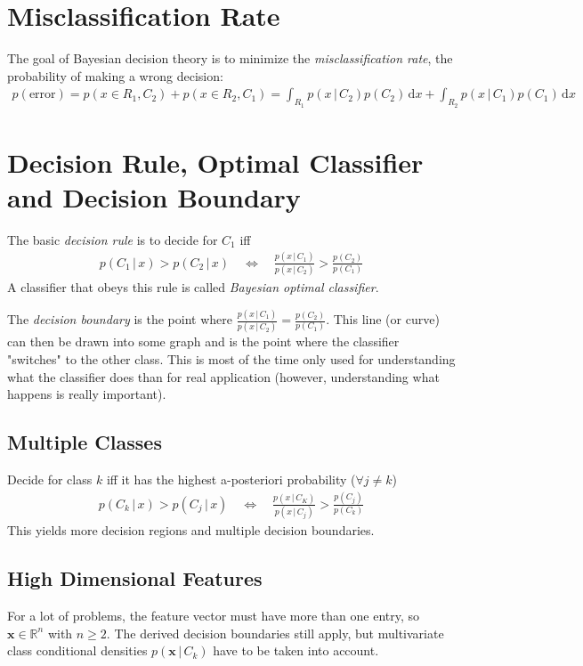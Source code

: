 \documentclass[a4paper, 11pt, accentcolor = tud3b]{tudreport}
\newcommand{\given}{\ensuremath{\,\vert\,}}
\newcommand{\R}{\ensuremath{\mathbb{R}}}
\newcommand{\dif}[1]{\ensuremath{\,\mathrm{d}#1}}
\renewcommand{\vec}[1]{\mathbf{#1}}
\begin{document}
		\section{Misclassification Rate}
			The goal of Bayesian decision theory is to minimize the \emph{misclassification rate}, the probability of making a wrong decision:
			\begin{align}
				p(\textrm{error}) = p(x \in R_1, C_2) + p(x \in R_2, C_1) = \int_{R_1} \! p(x \given C_2) p(C_2) \dif{x} + \int_{R_2} \! p(x \given C_1) p(C_1) \dif{x}
			\end{align}

		\section{Decision Rule, Optimal Classifier and Decision Boundary}
			\label{sec:bayesianDecisionRule}

			The basic \emph{decision rule} is to decide for \(C_1\) iff
			\begin{align}
				p(C_1 \given x) > p(C_2 \given x) \quad\iff\quad \frac{p(x \given C_1)}{p(x \given C_2)} > \frac{p(C_2)}{p(C_1)}
			\end{align}
			A classifier that obeys this rule is called \emph{Bayesian optimal classifier}.

			The \emph{decision boundary} is the point where \( \frac{p(x \given C_1)}{p(x \given C_2)} = \frac{p(C_2)}{p(C_1)} \). This line (or curve) can then be drawn into some graph and is the point where the classifier "switches" to the other class. This is most of the time only used for understanding what the classifier does than for real application (however, understanding what happens is really important).

			\subsection{Multiple Classes}
				Decide for class \(k\) iff it has the highest a-posteriori probability (\(\forall j \neq k\))
				\begin{align}
					p(C_k \given x) > p(C_j \given x) \quad\iff\quad \frac{p(x \given C_K)}{p(x \given C_j)} > \frac{p(C_j)}{p(C_k)}
				\end{align}
				This yields more decision regions and multiple decision boundaries.

			\subsection{High Dimensional Features}
				For a lot of problems, the feature vector must have more than one entry, so \( \vec{x} \in \R^n \) with \( n \geq 2 \). The derived decision boundaries still apply, but multivariate class conditional densities \( p(\vec{x} \given C_k) \) have to be taken into account.
\end{document}
